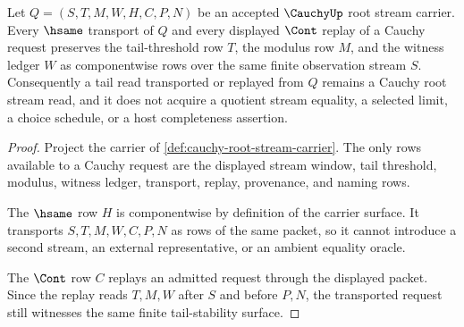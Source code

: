 \begin{theorem}
\label{thm:cauchy-root-tail-stability}
Let $Q=(S,T,M,W,H,C,P,N)$ be an accepted $\CauchyUp$ root stream carrier. Every $\hsame$ transport of $Q$ and every displayed $\Cont$ replay of a Cauchy request preserves the tail-threshold row $T$, the modulus row $M$, and the witness ledger $W$ as componentwise rows over the same finite observation stream $S$. Consequently a tail read transported or replayed from $Q$ remains a Cauchy root stream read, and it does not acquire a quotient stream equality, a selected limit, a choice schedule, or a host completeness assertion.
\end{theorem}
\begin{proof}
Project the carrier of \autoref{def:cauchy-root-stream-carrier}. The only rows available to a Cauchy request are the displayed stream window, tail threshold, modulus, witness ledger, transport, replay, provenance, and naming rows.

The $\hsame$ row $H$ is componentwise by definition of the carrier surface. It transports $S,T,M,W,C,P,N$ as rows of the same packet, so it cannot introduce a second stream, an external representative, or an ambient equality oracle.

The $\Cont$ row $C$ replays an admitted request through the displayed packet. Since the replay reads $T,M,W$ after $S$ and before $P,N$, the transported request still witnesses the same finite tail-stability surface.
\end{proof}


